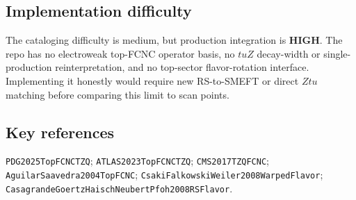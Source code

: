 \subsection*{Implementation difficulty}
The cataloging difficulty is medium, but production integration is \textbf{HIGH}.
The repo has no electroweak top-FCNC operator basis, no \(tuZ\) decay-width or
single-production reinterpretation, and no top-sector flavor-rotation
interface.  Implementing it honestly would require new RS-to-SMEFT or direct
\(Ztu\) matching before comparing this limit to scan points.

\subsection*{Key references}
\texttt{PDG2025TopFCNCTZQ}; \texttt{ATLAS2023TopFCNCTZQ};
\texttt{CMS2017TZQFCNC}; \texttt{AguilarSaavedra2004TopFCNC};
\texttt{CsakiFalkowskiWeiler2008WarpedFlavor};
\texttt{CasagrandeGoertzHaischNeubertPfoh2008RSFlavor}.
